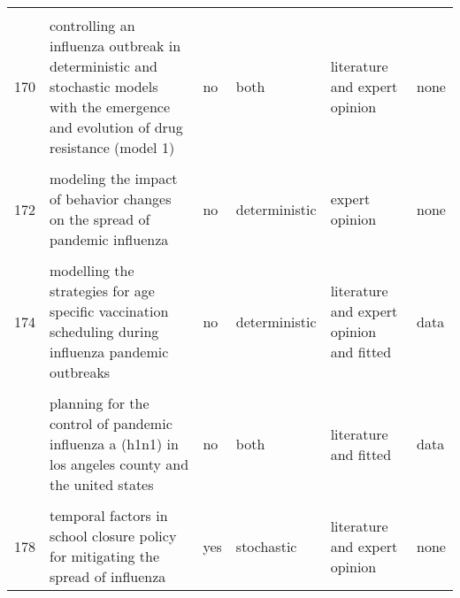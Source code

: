\documentclass[
]{article}
\begin{document}
\begin{landscape}
\begin{longtable}{l>{\raggedright\arraybackslash}p{3cm}l>{\raggedright\arraybackslash}p{3cm}ll}
\cellcolor{gray!6}{169} & \cellcolor{gray!6}{cholera epidemic in haiti, 2010: using a transmission model to explain spatial spread of disease and identify optimal control interventions} & \cellcolor{gray!6}{yes} & \cellcolor{gray!6}{stochastic} & \cellcolor{gray!6}{literature and expert opinion and fitted} & \cellcolor{gray!6}{data}\\
170 & controlling an influenza outbreak in deterministic and stochastic models with the emergence and evolution of drug resistance (model 1) & no & both & literature and expert opinion & none\\
\addlinespace
\cellcolor{gray!6}{171} & \cellcolor{gray!6}{modeling control strategies for concurrent epidemics of seasonal and pandemic h1n1 influenza} & \cellcolor{gray!6}{no} & \cellcolor{gray!6}{deterministic} & \cellcolor{gray!6}{literature and fitted} & \cellcolor{gray!6}{none}\\
172 & modeling the impact of behavior changes on the spread of pandemic influenza & no & deterministic & expert opinion & none\\
\cellcolor{gray!6}{173} & \cellcolor{gray!6}{modelling and analysis of influenza a (h1n1) on networks} & \cellcolor{gray!6}{no} & \cellcolor{gray!6}{deterministic} & \cellcolor{gray!6}{literature and fitted} & \cellcolor{gray!6}{data}\\
174 & modelling the strategies for age specific vaccination scheduling during influenza pandemic outbreaks & no & deterministic & literature and expert opinion and fitted & data\\
\cellcolor{gray!6}{175} & \cellcolor{gray!6}{modelling the transmission dynamics and control of the novel 2009 swine influenza (h1n1) pandemic} & \cellcolor{gray!6}{no} & \cellcolor{gray!6}{deterministic} & \cellcolor{gray!6}{literature and expert opinion and fitted} & \cellcolor{gray!6}{none}\\
\addlinespace
176 & planning for the control of pandemic influenza a (h1n1) in los angeles county and the united states & no & both & literature and fitted & data\\
\cellcolor{gray!6}{177} & \cellcolor{gray!6}{prioritization of delayed vaccination for pandemic influenza} & \cellcolor{gray!6}{no} & \cellcolor{gray!6}{deterministic} & \cellcolor{gray!6}{literature and expert opinion} & \cellcolor{gray!6}{none}\\
178 & temporal factors in school closure policy for mitigating the spread of influenza & yes & stochastic & literature and expert opinion & none\\

\end{longtable}
\end{landscape}
\end{document}
